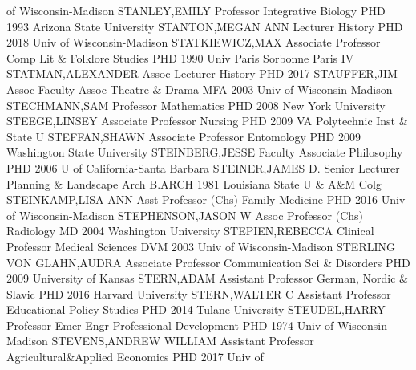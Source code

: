 \documentclass[
]{article}
\begin{document}
of Wisconsin-Madison \textbar STANLEY,EMILY \textbar Professor
\textbar{}  \textbar Integrative Biology \textbar PHD 1993
Arizona State University \textbar STANTON,MEGAN ANN \textbar Lecturer
\textbar{}  \textbar History \textbar PHD 2018 Univ of
Wisconsin-Madison \textbar STATKIEWICZ,MAX \textbar Associate Professor
\textbar{}  \textbar Comp Lit \& Folklore Studies
\textbar PHD 1990 Univ Paris Sorbonne Paris IV
\textbar STATMAN,ALEXANDER \textbar Assoc Lecturer \textbar{}
 \textbar History \textbar PHD 2017 \textbar STAUFFER,JIM
\textbar Assoc Faculty Assoc \textbar{}  \textbar Theatre \&
Drama \textbar MFA 2003 Univ of Wisconsin-Madison \textbar STECHMANN,SAM
\textbar Professor \textbar{}  \textbar Mathematics
\textbar PHD 2008 New York University \textbar STEEGE,LINSEY
\textbar Associate Professor \textbar{}  \textbar Nursing
\textbar PHD 2009 VA Polytechnic Inst \& State U \textbar STEFFAN,SHAWN
\textbar Associate Professor \textbar{}  \textbar Entomology
\textbar PHD 2009 Washington State University \textbar STEINBERG,JESSE
\textbar Faculty Associate \textbar{}  \textbar Philosophy
\textbar PHD 2006 U of California-Santa Barbara \textbar STEINER,JAMES
D. \textbar Senior Lecturer \textbar{}  \textbar Planning \&
Landscape Arch \textbar B.ARCH 1981 Louisiana State U \& A\&M Colg
\textbar STEINKAMP,LISA ANN \textbar Asst Professor (Chs) \textbar{}
 \textbar Family Medicine \textbar PHD 2016 Univ of
Wisconsin-Madison \textbar STEPHENSON,JASON W \textbar Assoc Professor
(Chs) \textbar{}  \textbar Radiology \textbar MD 2004
Washington University \textbar STEPIEN,REBECCA \textbar Clinical
Professor \textbar{}  \textbar Medical Sciences \textbar DVM
2003 Univ of Wisconsin-Madison \textbar STERLING VON GLAHN,AUDRA
\textbar Associate Professor \textbar{} 
\textbar Communication Sci \& Disorders \textbar PHD 2009 University of
Kansas \textbar STERN,ADAM \textbar Assistant Professor \textbar{}
 \textbar German, Nordic \& Slavic \textbar PHD 2016 Harvard
University \textbar STERN,WALTER C \textbar Assistant Professor
\textbar{}  \textbar Educational Policy Studies \textbar PHD
2014 Tulane University \textbar STEUDEL,HARRY \textbar Professor Emer
\textbar{}  \textbar Engr Professional Development
\textbar PHD 1974 Univ of Wisconsin-Madison \textbar STEVENS,ANDREW
WILLIAM \textbar Assistant Professor \textbar{} 
\textbar Agricultural\&Applied Economics \textbar PHD 2017 Univ of
\end{document}
